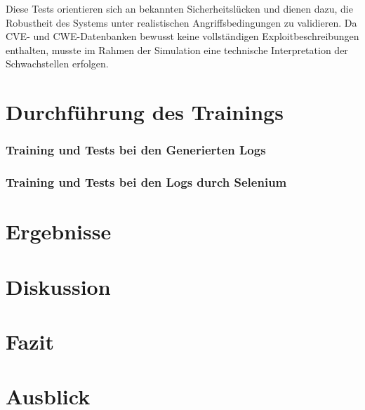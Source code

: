 \documentclass[a4paper,12pt]{article}
\begin{document}
	Diese Tests orientieren sich an bekannten Sicherheitslücken und dienen dazu, die Robustheit des Systems unter realistischen Angriffsbedingungen zu validieren. Da CVE- und CWE-Datenbanken bewusst keine vollständigen Exploitbeschreibungen enthalten, musste im Rahmen der Simulation eine technische Interpretation der Schwachstellen erfolgen.
		
	\section{Durchführung des Trainings}
	\subsubsection{Training und Tests bei den Generierten Logs}
	\subsubsection{Training und Tests bei den Logs durch Selenium}
	\section{Ergebnisse}
	\section{Diskussion}
	\section{Fazit}
	\section{Ausblick}
\newpage	

 
\newpage 
\renewcommand{\notesname}{Fußnotenverzeichnis}
\renewcommand{\enoteformat}{\rightskip0pt\leftskip0pt\vspace{0.5em}\noindent\makebox[2em][l]{\theenmark}}
\theendnotes
\end{document}
